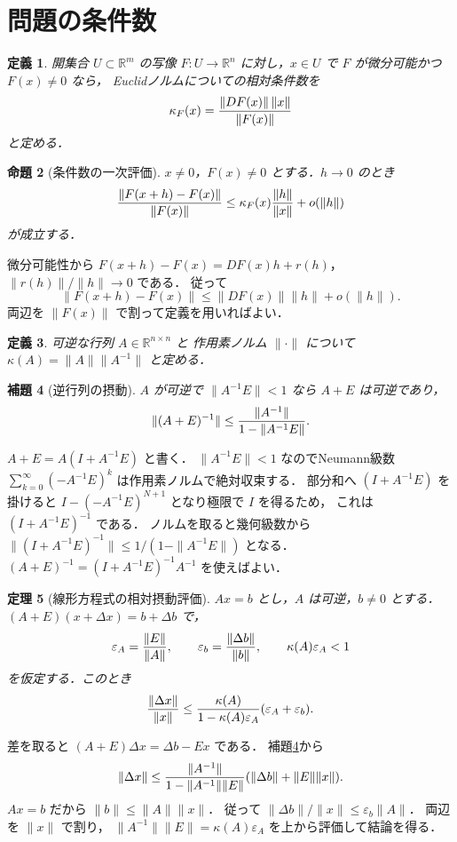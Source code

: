 \documentclass[a5paper,10pt,onecolumn]{jsarticle}
\makeatletter
\theoremstyle{mathnotetheorem}
\newtheorem{theorem}{定理}[section]
\newtheorem{definition}[theorem]{定義}
\newtheorem{lemma}[theorem]{補題}
\newtheorem{proposition}[theorem]{命題}
\renewcommand{\proofname}{証明}
\renewenvironment{proof}[1][\proofname]{%
  \par\pushQED{\qed}\normalfont\topsep4\p@\@plus2\p@\relax
  \trivlist\item[\hskip\labelsep\bfseries #1]\ignorespaces
}{\popQED\endtrivlist\@endpefalse}
\makeatother
\begin{document}
\section{問題の条件数}
\begin{definition}
開集合 $U\subset\mathbb R^m$ の写像
$F:U\to\mathbb R^n$ に対し，$x\in U$ で
$F$ が微分可能かつ $F(x)\ne0$ なら，
Euclidノルムについての相対条件数を
\[
 \kappa_F(x)={\|DF(x)\|\,\|x\|\over\|F(x)\|}
\]
と定める．
\end{definition}
\begin{proposition}[条件数の一次評価]
$x\ne0$，$F(x)\ne0$ とする．$h\to0$ のとき
\[
 {\|F(x+h)-F(x)\|\over\|F(x)\|}
 \le\kappa_F(x){\|h\|\over\|x\|}
 +o(\|h\|)
\]
が成立する．
\end{proposition}
\begin{proof}
微分可能性から
$F(x+h)-F(x)=DF(x)h+r(h)$，
$\|r(h)\|/\|h\|\to0$ である．
従って
\[
 \|F(x+h)-F(x)\|
 \le\|DF(x)\|\|h\|+o(\|h\|).
\]
両辺を $\|F(x)\|$ で割って定義を用いればよい．
\end{proof}
\begin{definition}
可逆な行列 $A\in\mathbb R^{n\times n}$ と
作用素ノルム $\|\cdot\|$ について
$\kappa(A)=\|A\|\|A^{-1}\|$ と定める．
\end{definition}
\begin{lemma}[逆行列の摂動]\label{lem:inverse}
$A$ が可逆で $\|A^{-1}E\|<1$ なら
$A+E$ は可逆であり，
\[
 \|(A+E)^{-1}\|
 \le{\|A^{-1}\|\over1-\|A^{-1}E\|}.
\]
\end{lemma}
\begin{proof}
$A+E=A(I+A^{-1}E)$ と書く．
$\|A^{-1}E\|<1$ なのでNeumann級数
$\sum_{k=0}^{\infty}(-A^{-1}E)^k$
は作用素ノルムで絶対収束する．
部分和へ $(I+A^{-1}E)$ を掛けると
$I-(-A^{-1}E)^{N+1}$ となり極限で $I$ を得るため，
これは $(I+A^{-1}E)^{-1}$ である．
ノルムを取ると幾何級数から
$\|(I+A^{-1}E)^{-1}\|\le
 1/(1-\|A^{-1}E\|)$ となる．
$(A+E)^{-1}=(I+A^{-1}E)^{-1}A^{-1}$ を使えばよい．
\end{proof}
\begin{theorem}[線形方程式の相対摂動評価]\label{thm:perturb}
$Ax=b$ とし，$A$ は可逆，$b\ne0$ とする．
$(A+E)(x+\Delta x)=b+\Delta b$ で，
\[
 \varepsilon_A={\|E\|\over\|A\|},\qquad
 \varepsilon_b={\|\Delta b\|\over\|b\|},\qquad
 \kappa(A)\varepsilon_A<1
\]
を仮定する．このとき
\[
 {\|\Delta x\|\over\|x\|}
 \le{\kappa(A)\over1-\kappa(A)\varepsilon_A}
 (\varepsilon_A+\varepsilon_b).
\]
\end{theorem}
\begin{proof}
差を取ると
$(A+E)\Delta x=\Delta b-Ex$ である．
補題\ref{lem:inverse}から
\[
 \|\Delta x\|
 \le{\|A^{-1}\|\over1-\|A^{-1}\|\|E\|}
 (\|\Delta b\|+\|E\|\|x\|).
\]
$Ax=b$ だから
$\|b\|\le\|A\|\|x\|$．
従って
$\|\Delta b\|/\|x\|\le
\varepsilon_b\|A\|$．
両辺を $\|x\|$ で割り，
$\|A^{-1}\|\|E\|=\kappa(A)\varepsilon_A$
を上から評価して結論を得る．
\end{proof}
\end{document}
